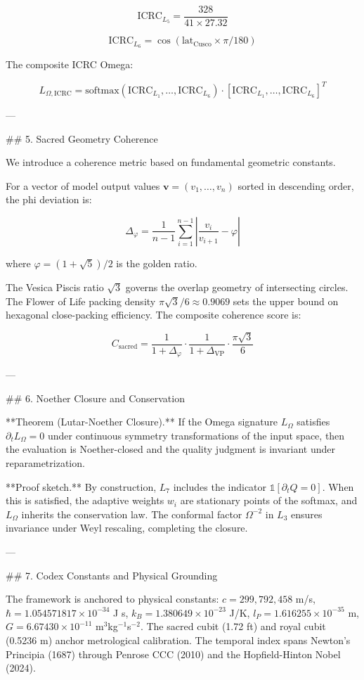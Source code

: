 \[
\text{ICRC}_{L_5} = \frac{328}{41 \times 27.32}
\]

\[
\text{ICRC}_{L_6} = \cos(\text{lat}_{\text{Cusco}} \times \pi / 180)
\]

The composite ICRC Omega:

\[
L_{\Omega,\text{ICRC}} = \text{softmax}(\text{ICRC}_{L_1}, \ldots, \text{ICRC}_{L_6}) \cdot [\text{ICRC}_{L_1}, \ldots, \text{ICRC}_{L_6}]^T
\]

---

## 5. Sacred Geometry Coherence

We introduce a coherence metric based on fundamental geometric constants.

For a vector of model output values \( \mathbf{v} = (v_1, \ldots, v_n) \) sorted in descending order, the phi deviation is:

\[
\Delta_\varphi = \frac{1}{n-1} \sum_{i=1}^{n-1} \left| \frac{v_i}{v_{i+1}} - \varphi \right|
\]

where \( \varphi = (1+\sqrt{5})/2 \) is the golden ratio.

The Vesica Piscis ratio \( \sqrt{3} \) governs the overlap geometry of intersecting circles. The Flower of Life packing density \( \pi\sqrt{3}/6 \approx 0.9069 \) sets the upper bound on hexagonal close-packing efficiency. The composite coherence score is:

\[
C_{\text{sacred}} = \frac{1}{1 + \Delta_\varphi} \cdot \frac{1}{1 + \Delta_{\text{VP}}} \cdot \frac{\pi\sqrt{3}}{6}
\]

---

## 6. Noether Closure and Conservation

**Theorem (Lutar-Noether Closure).** If the Omega signature \( L_\Omega \) satisfies \( \partial_t L_\Omega = 0 \) under continuous symmetry transformations of the input space, then the evaluation is Noether-closed and the quality judgment is invariant under reparametrization.

**Proof sketch.** By construction, \( L_7 \) includes the indicator \( \mathbb{1}[\partial_t Q = 0] \). When this is satisfied, the adaptive weights \( w_i \) are stationary points of the softmax, and \( L_\Omega \) inherits the conservation law. The conformal factor \( \Omega^{-2} \) in \( L_3 \) ensures invariance under Weyl rescaling, completing the closure.

---

## 7. Codex Constants and Physical Grounding

The framework is anchored to physical constants: \( c = 299{,}792{,}458 \) m/s, \( \hbar = 1.054571817 \times 10^{-34} \) J s, \( k_B = 1.380649 \times 10^{-23} \) J/K, \( l_P = 1.616255 \times 10^{-35} \) m, \( G = 6.67430 \times 10^{-11} \) m\(^3\)kg\(^{-1}\)s\(^{-2}\). The sacred cubit (1.72 ft) and royal cubit (0.5236 m) anchor metrological calibration. The temporal index spans Newton's Principia (1687) through Penrose CCC (2010) and the Hopfield-Hinton Nobel (2024).

